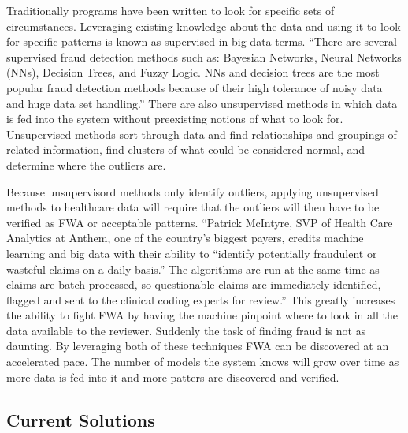 \documentclass[sigconf]{acmart}
\begin{document}
Traditionally programs have been written to look for specific sets of circumstances.  
Leveraging existing knowledge about the data and using it to look for specific patterns 
is known as supervised in big data terms.  ``There are several supervised fraud detection 
methods such as: Bayesian Networks, Neural Networks (NNs), Decision Trees, and Fuzzy 
Logic. NNs and decision trees are the most popular fraud detection methods because of 
their high tolerance of noisy data and huge data set handling.''\cite{Ghuse}  There are also 
unsupervised methods in which data is fed into the system without preexisting notions 
of what to look for\cite{Ghuse}.  Unsupervised methods sort through data and find 
relationships and groupings of related information, find clusters of what could be 
considered normal, and determine where the outliers are.

Because unsupervisord methods only identify outliers, applying unsupervised methods to 
healthcare data will require that the outliers will then have to be verified as FWA or 
acceptable patterns.  ``Patrick McIntyre, SVP of Health Care Analytics at Anthem, one 
of the country's biggest payers, credits machine learning and big data with their 
ability to ``identify potentially fraudulent or wasteful claims on a daily basis.'' The 
algorithms are run at the same time as claims are batch processed, so questionable 
claims are immediately identified, flagged and sent to the clinical coding experts for 
review.''\cite{Datameer}  This greatly increases the ability to fight FWA by having the 
machine pinpoint where to look in all the data available to the reviewer.  Suddenly the task 
of finding fraud is not as daunting.  By leveraging both of these techniques FWA can be 
discovered at an accelerated pace.  The number of models the system knows will grow over 
time as more data is fed into it and more patters are discovered and verified.


\subsection{Current Solutions}
\end{document}
